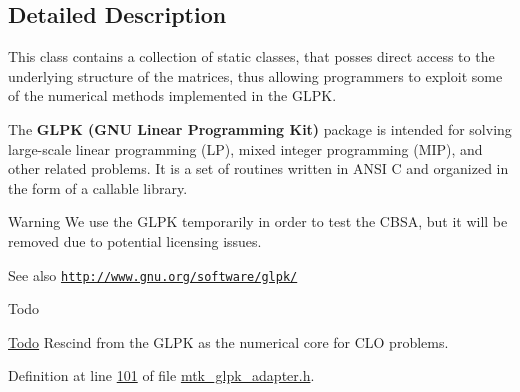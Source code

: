 \subsection{Detailed Description}
This class contains a collection of static classes, that posses direct access to the underlying structure of the matrices, thus allowing programmers to exploit some of the numerical methods implemented in the G\+L\+P\+K.

The {\bfseries G\+L\+P\+K (G\+N\+U Linear Programming Kit)} package is intended for solving large-\/scale linear programming (L\+P), mixed integer programming (M\+I\+P), and other related problems. It is a set of routines written in A\+N\+S\+I C and organized in the form of a callable library.

\begin{DoxyWarning}{Warning}
We use the G\+L\+P\+K temporarily in order to test the C\+B\+S\+A, but it will be removed due to potential licensing issues.
\end{DoxyWarning}
\begin{DoxySeeAlso}{See also}
\href{http://www.gnu.org/software/glpk/}{\tt http\+://www.\+gnu.\+org/software/glpk/}
\end{DoxySeeAlso}
\begin{DoxyRefDesc}{Todo}
\item[\hyperlink{todo__todo000003}{Todo}]Rescind from the G\+L\+P\+K as the numerical core for C\+L\+O problems. \end{DoxyRefDesc}


Definition at line \hyperlink{mtk__glpk__adapter_8h_source_l00101}{101} of file \hyperlink{mtk__glpk__adapter_8h_source}{mtk\+\_\+glpk\+\_\+adapter.\+h}.



